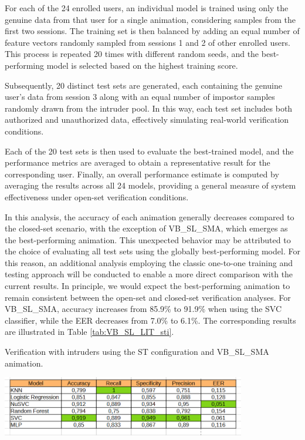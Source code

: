 \documentclass[12pt]{report}
\begin{document}
For each of the 24 enrolled users, an individual model is trained using only the genuine data from that user for a single animation, considering samples from the first two sessions.
The training set is then balanced by adding an equal number of feature vectors randomly sampled from sessions 1 and 2 of other enrolled users.
This process is repeated 20 times with different random seeds, and the best-performing model is selected based on the highest training score.

Subsequently, 20 distinct test sets are generated, each containing the genuine user's data from session 3 along with an equal number of impostor samples randomly drawn from the intruder pool.
In this way, each test set includes both authorized and unauthorized data, effectively simulating real-world verification conditions.

Each of the 20 test sets is then used to evaluate the best-trained model, and the performance metrics are averaged to obtain a representative result for the corresponding user.
Finally, an overall performance estimate is computed by averaging the results across all 24 models, providing a general measure of system effectiveness under open-set verification conditions.

In this analysis, the accuracy of each animation generally decreases compared to the closed-set scenario, with the exception of VB\_SL\_SMA, which emerges as the best-performing animation.
This unexpected behavior may be attributed to the choice of evaluating all test sets using the globally best-performing model.
For this reason, an additional analysis employing the classic one-to-one training and testing approach will be conducted to enable a more direct comparison with the current results.
In principle, we would expect the best-performing animation to remain consistent between the open-set and closed-set verification analyses.
For VB\_SL\_SMA, accuracy increases from 85.9\% to 91.9\% when using the SVC classifier, while the EER decreases from 7.0\% to 6.1\%.
The corresponding results are illustrated in Table \ref{tab:VB_SL_LIT_sti}.

\begin{table}[ht]
    \centering
    \caption{Verification with intruders using the ST configuration and VB\_SL\_SMA animation.}
    \includegraphics[width=0.8\textwidth]{Images/Results/Verification_single_intruders/st/VB_SL_LIT.png}
    \label{tab:VB_SL_LIT_sti}
\end{table}
\end{document}
